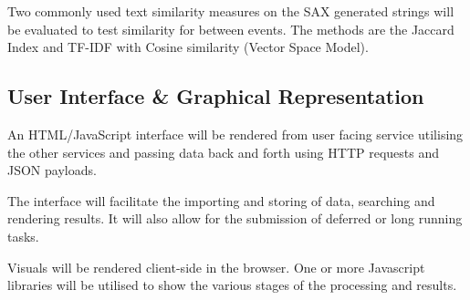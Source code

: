 \documentclass[../report.tex]{subfiles}
\begin{document}
	Two commonly used text similarity measures on the SAX generated strings will be evaluated to test similarity for between events.  The methods are the Jaccard Index and TF-IDF with Cosine similarity (Vector Space Model).

\subsection{User Interface \& Graphical Representation}

	An HTML/JavaScript interface will be rendered from user facing service utilising the other services and passing data back and forth using HTTP requests and JSON payloads.
	
	The interface will facilitate the importing and storing of data, searching and rendering results.  It will also allow for the submission of deferred or long running tasks.
	
	Visuals will be rendered client-side in the browser.  One or more Javascript libraries will be utilised to show the various stages of the processing and results.
\end{document}
